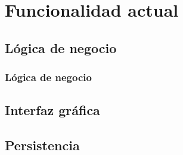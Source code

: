 \section{Funcionalidad actual}

\subsection{Lógica de negocio}
\subsubsection{Lógica de negocio}
\subsection{Interfaz gráfica}

\subsection{Persistencia}

